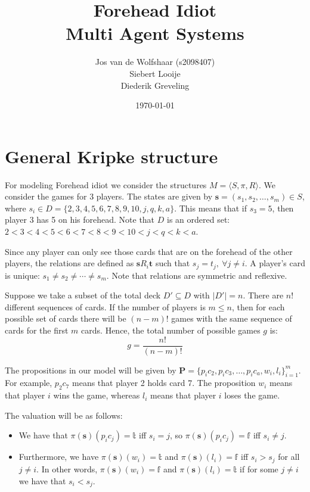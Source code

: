 \documentclass[a4paper,10pt]{article}
\title{Forehead Idiot\\ {\Large Multi Agent Systems}}
\author{Jos van de Wolfshaar (s2098407)\\
Siebert Looije\\
Diederik Greveling}
\date{\today}
\begin{document}
\maketitle
\section{General Kripke structure}
For modeling Forehead idiot we consider the structures $M = \langle S, \pi, R \rangle$. We consider the games for 3 players. The states are given by $\boldsymbol s = (s_1,s_2,\ldots,s_m) \in S$, where $s_i \in D = \{ 2,3,4,5,6,7,8,9,10,j,q,k,a \}$. This means that if $s_3 = 5$, then player 3 has 5 on his forehead. Note that $D$ is an ordered set:
$2<3<4<5<6<7<8<9<10<j<q<k<a$.

Since any player can only see those cards that are on the forehead of the other players, the relations are defined as $\boldsymbol s R_i \boldsymbol t$ such that $s_j = t_j,~\forall j \neq i$. A player's card is unique: $s_1 \neq s_2 \neq \cdots \neq s_m$. Note that relations are symmetric and reflexive.

Suppose we take a subset of the total deck $D'\subseteq D$ with $|D'|=n$. There are $n!$ different sequences of cards. If the number of players is $m\leq n$, then for each possible set of cards there will be $(n-m)!$ games with the same sequence of cards for the first $m$ cards. Hence, the total number of possible games $g$ is:
\begin{equation}
 g=\frac{n!}{(n-m)!}
\end{equation}

The propositions in our model will be given by $\boldsymbol P = \{ p_ic_2,p_ic_3,\ldots,p_ic_a,w_i,l_i\}_{i=1}^m$. For example, $p_2 c_7$ means that player 2 holds card 7. The proposition $w_i$ means that player $i$ wins the game, whereas $l_i$ means that player $i$ loses the game.

The valuation will be as follows:
\begin{itemize}
 \item We have that $\pi(\boldsymbol s)(p_ic_j) = \mathbb{t}$ iff $s_i = j$, so $\pi(\boldsymbol s)(p_ic_j) = \mathbb{f}$ iff $s_i \neq j$. 
 \item Furthermore, we have $\pi(\boldsymbol s)(w_i) = \mathbb{t}$ and $\pi(\boldsymbol s)(l_i) = \mathbb{f}$ iff $s_i > s_j$ for all $j \neq i$. In other words, $\pi(\boldsymbol s)(w_i)=\mathbb{f}$ and $\pi(\boldsymbol s)(l_i) = \mathbb{t}$ if for some $j\neq i$ we have that $s_i < s_j$. 
\end{itemize}
\end{document}
